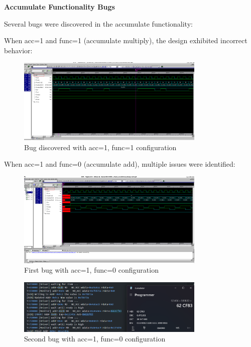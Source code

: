 \documentclass[11pt]{article}
\begin{document}
\textbf{Accumulate Functionality Bugs}

Several bugs were discovered in the accumulate functionality:

When acc=1 and func=1 (accumulate multiply), the design exhibited incorrect behavior:

\begin{figure}[h]
\centering
\includegraphics[width=0.8\textwidth]{acc_high_func_high_bug.png}
\caption{Bug discovered with acc=1, func=1 configuration}
\end{figure}

When acc=1 and func=0 (accumulate add), multiple issues were identified:

\begin{figure}[h]
\centering
\includegraphics[width=0.8\textwidth]{acc_high_func_low_bug.png}
\caption{First bug with acc=1, func=0 configuration}
\end{figure}

\begin{figure}[h]
\centering
\includegraphics[width=0.8\textwidth]{acc_high_func_low_bug_2.png}
\caption{Second bug with acc=1, func=0 configuration}
\end{figure}
\end{document}
